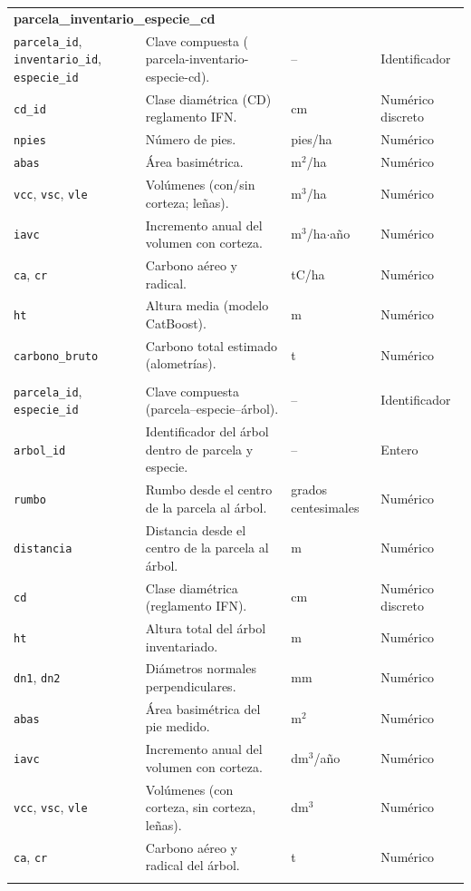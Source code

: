 \begin{longtable}{p{3.2cm} p{7.6cm} p{2.4cm} p{2.4cm}}
\multicolumn{4}{l}{\textbf{parcela\_inventario\_especie\_cd}} \\
\texttt{parcela\_id}, \texttt{inventario\_id}, \texttt{especie\_id} & Clave compuesta ( parcela-inventario-especie-cd). & -- & Identificador \\
\texttt{cd\_id} & Clase diamétrica (CD) reglamento IFN. & cm & Numérico discreto \\
\texttt{npies} & Número de pies. & pies/ha & Numérico \\
\texttt{abas} & Área basimétrica. & m$^{2}$/ha & Numérico \\
\texttt{vcc}, \texttt{vsc}, \texttt{vle} & Volúmenes (con/sin corteza; leñas). & m$^{3}$/ha & Numérico \\
\texttt{iavc} & Incremento anual del volumen con corteza. & m$^{3}$/ha$\cdot$año & Numérico \\
\texttt{ca}, \texttt{cr} & Carbono aéreo y radical. & tC/ha & Numérico \\
\texttt{ht} & Altura media (modelo CatBoost). & m & Numérico \\
\texttt{carbono\_bruto} & Carbono total estimado (alometrías). & t & Numérico \\
\addlinespace

\multicolumn{4}{l}{\textbf{parcela\_especie\_arbol}} \\
\texttt{parcela\_id}, \texttt{especie\_id} & Clave compuesta (parcela–especie–árbol). & -- & Identificador \\ 
\texttt{arbol\_id} & Identificador del árbol dentro de parcela y especie. & -- & Entero \\ 
\texttt{rumbo} & Rumbo desde el centro de la parcela al árbol. & grados centesimales & Numérico \\ 
\texttt{distancia} & Distancia desde el centro de la parcela al árbol. & m & Numérico \\ 
\texttt{cd} & Clase diamétrica (reglamento IFN). & cm & Numérico discreto \\ 
\texttt{ht} & Altura total del árbol inventariado. & m & Numérico \\ 
\texttt{dn1}, \texttt{dn2} & Diámetros normales perpendiculares. & mm & Numérico \\ 
\texttt{abas} & Área basimétrica del pie medido. & m$^{2}$ & Numérico \\ 
\texttt{iavc} & Incremento anual del volumen con corteza. & dm$^{3}$/año & Numérico \\ 
\texttt{vcc}, \texttt{vsc}, \texttt{vle} & Volúmenes (con corteza, sin corteza, leñas). & dm$^{3}$ & Numérico \\ 
\texttt{ca}, \texttt{cr} & Carbono aéreo y radical del árbol. & t & Numérico \\
\addlinespace


\end{longtable}
